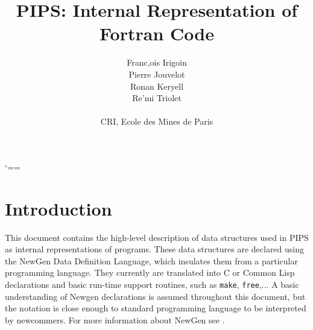 
% 

\title{PIPS: Internal Representation of Fortran Code}
\author{Franc,ois Irigoin \\
        Pierre Jouvelot \\
    Ronan Keryell \\
        Re'mi Triolet\\
\\
        CRI, Ecole des Mines de Paris}

      {
        \catcode `==\active
        \gdef\domain{\medskip\par\noindent
          \bgroup
          \catcode `_ \other
          \catcode `= \active
          \def={\em{\rm \string=}}
          \tt\em\vraidomain}
        \gdef\vraidomain#1{#1\egroup\medskip\par}
        }


\renewcommand{\indexname}{Index}

\makeindex


\maketitle
\sloppy

\section*{Introduction}

This document contains the high-level description of data structures
used in PIPS as internal representations of programs. These data
structures are declared using the NewGen Data Definition Language, which
insulates them from a particular programming language. They currently
are translated into C or Common Lisp declarations and basic run-time
support routines, such as \verb+make+, \verb+free+,... A basic
understanding of Newgen declarations is assumed throughout this
document, but the notation is close enough to standard programming
language to be interpreted by newcommers. For more information about
NewGen see \cite{}\cite{}.

